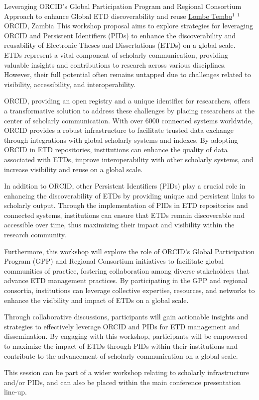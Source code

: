 
    \begin{abstract_online}{Leveraging ORCID's Global Participation Program and Regional Consortium Approach to enhance Global  ETD discoverability and reuse}{%
        \underline{Lombe Tembo}$^{1}$}{%
        }{%
        $^1$ ORCID, Zambia}
        This workshop proposal aims to explore strategies for leveraging ORCID and Persistent Identifiers (PIDs) to enhance the discoverability and reusability of Electronic Theses and Dissertations (ETDs) on a global scale. ETDs represent a vital component of scholarly communication, providing valuable insights and contributions to research across various disciplines. However, their full potential often remains untapped due to challenges related to visibility, accessibility, and interoperability.

        ORCID, providing an open registry and a unique identifier for researchers, offers a transformative solution to address these challenges by placing researchers at the center of scholarly communication. With over 6000 connected systems worldwide, ORCID provides a robust infrastructure to facilitate trusted data exchange through  integrations with global scholarly systems and indexes. By adopting ORCID in ETD repositories, institutions can enhance the quality of data associated with ETDs, improve interoperability with other scholarly systems, and increase visibility and reuse on a global scale.

        In addition to ORCID, other Persistent Identifiers (PIDs) play a crucial role in enhancing the discoverability of ETDs by providing unique and persistent links to scholarly output. Through the implementation of PIDs in ETD repositories and connected systems, institutions can ensure that ETDs remain discoverable and accessible over time, thus maximizing their impact and visibility within the research community.

        Furthermore, this workshop will explore the role of ORCID's Global Participation Program (GPP) and Regional Consortium initiatives to facilitate global communities of practice, fostering collaboration among diverse stakeholders that advance ETD management practices. By participating in the GPP and regional consortia, institutions can leverage collective expertise, resources, and networks to enhance the visibility and impact of ETDs on a global scale.

        Through collaborative discussions, participants will gain actionable insights and strategies to effectively leverage ORCID and PIDs for ETD management and dissemination. By engaging with this workshop, participants will be empowered to maximize the impact of ETDs through PIDs within their institutions and contribute to the advancement of scholarly communication on a global scale.

        This session can be part of a wider workshop relating to scholarly infrastructure and/or PIDs, and can also be placed within the main conference presentation line-up.
    
    \end{abstract_online}
    
